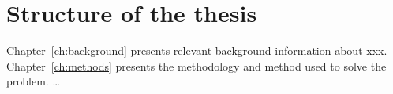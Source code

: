 \section{Structure of the thesis} %
Chapter~\ref{ch:background} presents relevant background information about xxx.  Chapter~\ref{ch:methods} presents the methodology and method used to solve the problem. …